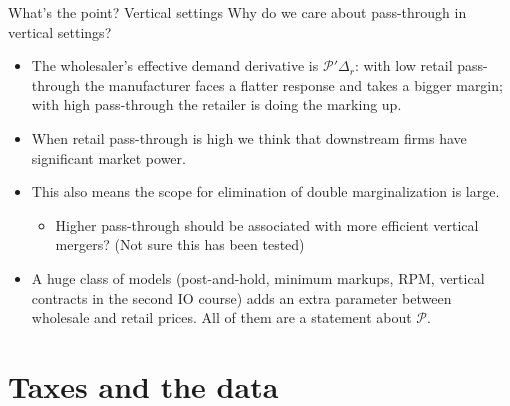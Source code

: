 \documentclass[aspectratio=169,10pt]{beamer}
\begin{document}
\begin{frame}{What's the point? Vertical settings}
Why do we care about pass-through in vertical settings?
\begin{itemize}
\item The wholesaler's effective demand derivative is $\mathcal{P}' \Delta_r$: with low retail pass-through the manufacturer faces a flatter response and takes a bigger margin; with high pass-through the retailer is doing the marking up.
\item When retail pass-through is high we think that downstream firms have significant market power.
\item This also means the scope for \alert{elimination of double marginalization} is large.
\begin{itemize}
\item Higher pass-through should be associated with more efficient vertical mergers? (Not sure this has been tested)
\end{itemize}
\item A huge class of models (post-and-hold, minimum markups, RPM, vertical contracts in the second IO course) adds an extra parameter between wholesale and retail prices. All of them are a statement about $\mathcal{P}$.
\end{itemize}
\end{frame}


\section{Taxes and the data}
\end{document}
